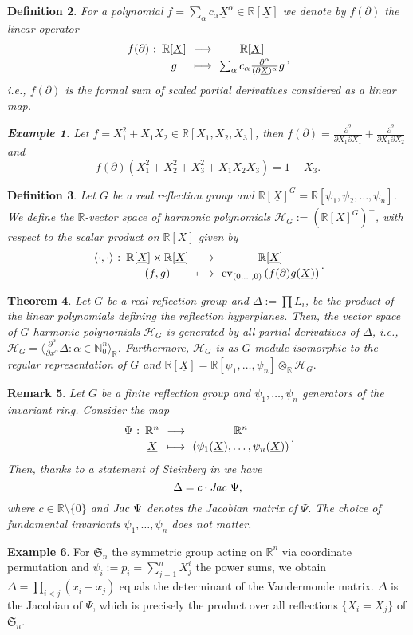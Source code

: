 \documentclass[11pt,a4paper]{amsart}
\newcommand{\abb}[5]{%
\setlength{\arraycolsep}{0.4ex}%
\begin{array}{rcccc}%
#1 &:\,& #2 & \,\,\longrightarrow\,\, & #3 \\[0.5ex]%
     & & #4 & \longmapsto & #5%
\end{array}%
}
\numberwithin{equation}{section}
\newtheorem{thm}{Theorem}
\newtheorem{definition}[thm]{Definition}
\newtheorem{remark}[thm]{Remark}
\theoremstyle{definition}
\newtheorem{example}[thm]{Example}
\newcommand{\N}{\mathbb{N}}
\newcommand{\R}{\mathbb{R}}
\DeclareMathOperator{\ev}{ev}
\numberwithin{thm}{section}
\theoremstyle{break}
\numberwithin{subcase}{case}
\begin{document}
\begin{definition}
For a polynomial $f=\sum_\alpha c_\alpha \underline{X}^\alpha  \in \R[\underline{X}]$ we denote by $f(\partial)$ the linear operator $$ \abb{f(\partial )}{\R[\underline{X}]}{\R[\underline{X}]}{g}{\sum_\alpha c_\alpha \frac{\partial^\alpha}{ (\partial \underline{X})^\alpha }g},$$ i.e., $f(\partial)$ is the formal sum of scaled partial derivatives considered as a linear map. 
\begin{example}
Let $f = X_1^2+X_1X_2 \in \R[X_1,X_2,X_3]$, then $f(\partial) = \frac{\partial^2}{\partial X_1 \partial X_1} + \frac{\partial^2}{\partial X_1 \partial X_2}$ and $$f(\partial) \left( X_1^2+X_2^2+X_3^2 +X_1X_2X_3 \right) = 1 +X_3.$$
\end{example}
\end{definition}
\begin{definition}
Let $G$ be a real reflection group and $\R[\underline{X}]^G = \R[\psi_1,\psi_2,\ldots,\psi_n]$. We define the $\R$-vector space of harmonic polynomials $\mathcal{H}_G := \left( \R[\underline{X}]^G\right)^\perp$, with respect to the scalar product on $\R[\underline{X}]$ given by $$ \abb{\langle \cdot , \cdot \rangle}{\R[\underline{X}] \times \R[\underline{X}]}{\R[\underline{X}]}{(f,g)}{ \ev_{(0,\ldots,0)}\left( f(\partial) g(\underline{X}) \right)}.$$
\end{definition}
\begin{thm}\cite{bergeron2009algebraic}
Let $G$ be a real reflection group and $\Delta:=\prod L_i$, be the product of the linear polynomials defining the reflection hyperplanes. Then, the vector space of $G$-harmonic polynomials $\mathcal{H}_G$ is generated by all partial derivatives of $\Delta$, i.e., $\mathcal{H}_G = \langle \frac{\partial^\alpha}{\partial x^\alpha}\Delta : \alpha \in \N_0^n \rangle_\R$. Furthermore, $\mathcal{H}_G$ is as $G$-module isomorphic to the regular representation of $G$ and $\R[\underline{X}] = \R[\psi_1,\ldots,\psi_n]\otimes_\R \mathcal{H}_G.$ 
\end{thm}

\begin{remark}
Let $G$ be a finite reflection group and $\psi_1,\ldots,\psi_n$ generators of the invariant ring.  Consider the map $$\abb{\Psi}{\R^n}{\R^n}{\underline{X}}{(\psi_1(\underline{X}),\ldots,\psi_n(\underline{X}))}.$$
Then, thanks to a statement of Steinberg in \cite{steinberg1960invariants} we have $$\Delta = c\cdot \emph{Jac } \Psi,$$ where $c \in \R \setminus \{0\}$ and $\emph{Jac } \Psi$ denotes the Jacobian matrix of $\Psi$. The choice of fundamental invariants $\psi_1,\ldots,\psi_n$ does not matter. 
\end{remark}
\begin{example}
For $\mathfrak{S}_n$ the symmetric group acting on $\R^n$ via coordinate permutation and $\psi_i := p_i = \sum_{j=1}^n X_j^i$ the power sums, we obtain $\Delta = \prod_{i < j}(x_i-x_j)$ equals the determinant of the Vandermonde matrix. $\Delta$ is the Jacobian of $\Psi$, which is precisely the product over all reflections $\{ X_i = X_j\}$ of $\mathfrak{S}_n$.
\end{example}
\end{document}
